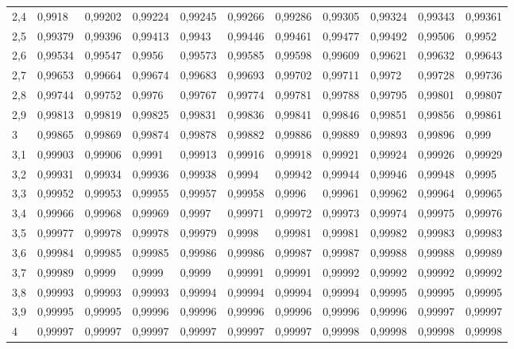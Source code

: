 \documentclass[4apaper,12pt]{book}
\begin{document}
\begin{description}
\begin{table}[]
\begin{tabular}{lllllllllll}
        2,4 & 0,9918  & 0,99202 & 0,99224 & 0,99245 & 0,99266 & 0,99286 & 0,99305 & 0,99324 & 0,99343 & 0,99361 \\
        2,5 & 0,99379 & 0,99396 & 0,99413 & 0,9943  & 0,99446 & 0,99461 & 0,99477 & 0,99492 & 0,99506 & 0,9952  \\
        2,6 & 0,99534 & 0,99547 & 0,9956  & 0,99573 & 0,99585 & 0,99598 & 0,99609 & 0,99621 & 0,99632 & 0,99643 \\
        2,7 & 0,99653 & 0,99664 & 0,99674 & 0,99683 & 0,99693 & 0,99702 & 0,99711 & 0,9972  & 0,99728 & 0,99736 \\
        2,8 & 0,99744 & 0,99752 & 0,9976  & 0,99767 & 0,99774 & 0,99781 & 0,99788 & 0,99795 & 0,99801 & 0,99807 \\
        2,9 & 0,99813 & 0,99819 & 0,99825 & 0,99831 & 0,99836 & 0,99841 & 0,99846 & 0,99851 & 0,99856 & 0,99861 \\
        3   & 0,99865 & 0,99869 & 0,99874 & 0,99878 & 0,99882 & 0,99886 & 0,99889 & 0,99893 & 0,99896 & 0,999   \\
        3,1 & 0,99903 & 0,99906 & 0,9991  & 0,99913 & 0,99916 & 0,99918 & 0,99921 & 0,99924 & 0,99926 & 0,99929 \\
        3,2 & 0,99931 & 0,99934 & 0,99936 & 0,99938 & 0,9994  & 0,99942 & 0,99944 & 0,99946 & 0,99948 & 0,9995  \\
        3,3 & 0,99952 & 0,99953 & 0,99955 & 0,99957 & 0,99958 & 0,9996  & 0,99961 & 0,99962 & 0,99964 & 0,99965 \\
        3,4 & 0,99966 & 0,99968 & 0,99969 & 0,9997  & 0,99971 & 0,99972 & 0,99973 & 0,99974 & 0,99975 & 0,99976 \\
        3,5 & 0,99977 & 0,99978 & 0,99978 & 0,99979 & 0,9998  & 0,99981 & 0,99981 & 0,99982 & 0,99983 & 0,99983 \\
        3,6 & 0,99984 & 0,99985 & 0,99985 & 0,99986 & 0,99986 & 0,99987 & 0,99987 & 0,99988 & 0,99988 & 0,99989 \\
        3,7 & 0,99989 & 0,9999  & 0,9999  & 0,9999  & 0,99991 & 0,99991 & 0,99992 & 0,99992 & 0,99992 & 0,99992 \\
        3,8 & 0,99993 & 0,99993 & 0,99993 & 0,99994 & 0,99994 & 0,99994 & 0,99994 & 0,99995 & 0,99995 & 0,99995 \\
        3,9 & 0,99995 & 0,99995 & 0,99996 & 0,99996 & 0,99996 & 0,99996 & 0,99996 & 0,99996 & 0,99997 & 0,99997 \\
        4   & 0,99997 & 0,99997 & 0,99997 & 0,99997 & 0,99997 & 0,99997 & 0,99998 & 0,99998 & 0,99998 & 0,99998
      \end{tabular}
    \end{table}

\end{description}
\end{document}
